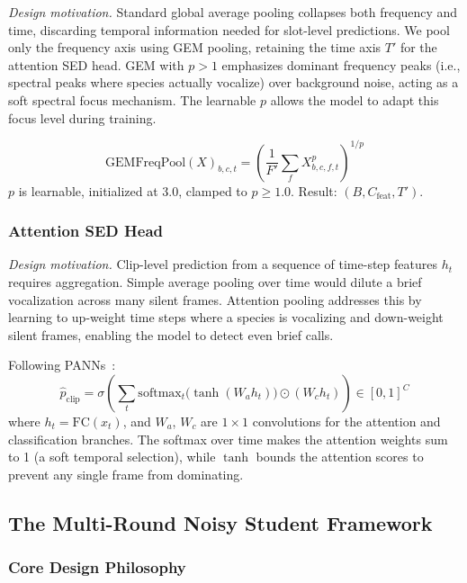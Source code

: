 \documentclass[journal]{IEEEtran}
\begin{document}
\emph{Design motivation.}
Standard global average pooling collapses both frequency and time, discarding temporal information needed for slot-level predictions.
We pool only the frequency axis using GEM pooling, retaining the time axis $T'$ for the attention SED head.
GEM with $p>1$ emphasizes dominant frequency peaks (i.e., spectral peaks where species actually vocalize) over background noise, acting as a soft spectral focus mechanism.
The learnable $p$ allows the model to adapt this focus level during training.

\begin{equation}
  \text{GEMFreqPool}(X)_{b,c,t} = \left(\frac{1}{F'}\sum_{f} X_{b,c,f,t}^p\right)^{1/p}
\end{equation}
$p$ is learnable, initialized at 3.0, clamped to $p\geq1.0$.
Result: $(B, C_\text{feat}, T')$.

\subsubsection{Attention SED Head}

\emph{Design motivation.}
Clip-level prediction from a sequence of time-step features $h_t$ requires aggregation.
Simple average pooling over time would dilute a brief vocalization across many silent frames.
Attention pooling addresses this by learning to up-weight time steps where a species is vocalizing and down-weight silent frames, enabling the model to detect even brief calls.

Following PANNs~\cite{kong2020panns}:
\begin{equation}
  \hat{p}_\text{clip} = \sigma\!\left(\sum_{t} \mathrm{softmax}_t\!\bigl(\tanh(W_a h_t)\bigr) \odot (W_c h_t)\right) \in [0,1]^{C}
\end{equation}
where $h_t = \mathrm{FC}(x_t)$, and $W_a$, $W_c$ are $1\!\times\!1$ convolutions for the attention and classification branches.
The softmax over time makes the attention weights sum to 1 (a soft temporal selection), while $\tanh$ bounds the attention scores to prevent any single frame from dominating.

\subsection{The Multi-Round Noisy Student Framework}

\subsubsection{Core Design Philosophy}
\end{document}
